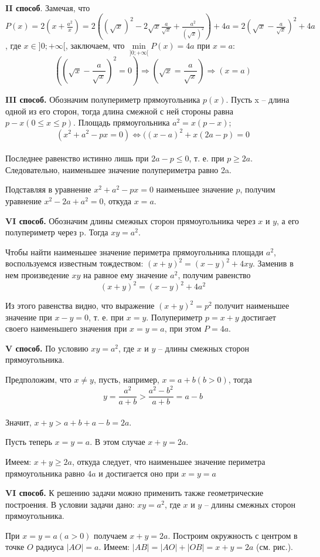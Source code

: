 \documentclass{article}
\begin{document}
\\\textbf{II способ}. Замечая, что $P(x)=2(x+\frac{a^2}{x})=2((\sqrt{x})^2-2\sqrt{x}\frac{a}{\sqrt{x}}+\frac{a^2}{(\sqrt{x})^2})+4a=2(\sqrt{x}-\frac{a}{\sqrt{x}})^2+4a$, где $x\in]0;+\infty[$, заключаем, что $\min\limits_{]0;+\infty[}P(x)=4a$ при $x=a$:
$$((\sqrt{x}-\frac{a}{\sqrt{x}})^2=0)\Rightarrow(\sqrt{x}=\frac{a}{\sqrt{x}})\Rightarrow(x=a)$$
\par\textbf{III способ.} Обозначим полупериметр прямоугольника $p(x)$. Пусть x -- длина одной из его сторон, тогда длина смежной с ней стороны равна $p-x(0\leqslant x\leqslant p)$. Площадь прямоугольника $a^2=x(p-x)$;
$$(x^2+a^2-px=0)\Leftrightarrow((x-a)^2+x(2a-p)=0$$
\\Последнее равенство истинно лишь при $2a-p\leqslant0$, т. е. при $p\geqslant2a$. Следовательно, наименьшее значение полупериметра равно 2a.
\par Подставляя в уравнение $x^2+a^2-px=0$ наименьшее значение $p$, получим уравнение $x^2-2a+a^2=0$, откуда $x=a$.
\par\textbf{VI способ.} Обозначим длины смежных сторон прямоугольника через $x$ и $y$, а его полупериметр через p. Тогда $xy=a^2$.
\par Чтобы найти наименьшее значение периметра прямоугольника площади $a^2$, воспользуемся известным тождеством: $(x+y)^2=(x-y)^2+4xy$. Заменив в нем произведение $xy$ на равное ему значение $a^2$, получим равенство
$$(x+y)^2=(x-y)^2+4a^2$$
\par Из этого равенства видно, что выражение $(x+y)^2=p^2$ получит наименьшее значение при $x-y=0$, т. е. при $x=y$. Полупериметр $p=x+y$ достигает своего наименьшего значения при $x=y=a$, при этом $P=4a$. 
\par\textbf{V способ.} По условию $xy=a^2$, где $x$ и $y$ -- длины смежных сторон прямоугольника.
\par Предположим, что $x\neq y$, пусть, например, $x=a+b(b>0)$, тогда 
$$y=\frac{a^2}{a+b}>\frac{a^2-b^2}{a+b}=a-b$$
\\Значит, $x+y>a+b+a-b=2a$.
\par Пусть теперь $x=y=a$. В этом случае $x+y=2a$.
\par Имеем: $x+y\geqslant2a$, откуда следует, что наименьшее значение периметра прямоугольника равно $4a$ и достигается оно при $x=y=a$
\par\textbf{VI способ.} К решению задачи можно применить также геометрические построения. В условии задачи дано: $xy=a^2$, где $x$ и $y$ -- длины смежных сторон прямоугольника.
\par При $x=y=a(a>0)$ получаем $x+y=2a$. Построим окружность с центром в точке $O$ радиуса $|AO|=a$. Имеем: $|AB|=|AO|+|OB|=x+y=2a$ (см. рис.).
\end{document}
